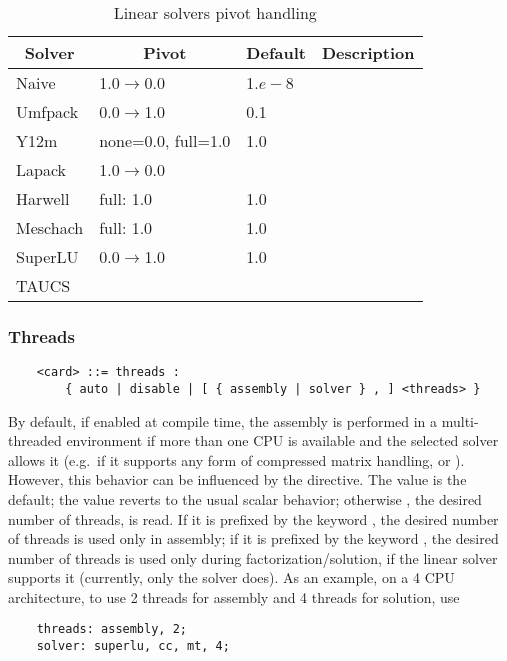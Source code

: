 \begin{table}
\centering
\caption{Linear solvers pivot handling}\label{tab:solvers-pivot}
\begin{tabular}{llll}
\hline\hline
	\multicolumn{1}{c}{\textbf{Solver}} &
	\multicolumn{1}{c}{\textbf{Pivot}} &
	\multicolumn{1}{c}{\textbf{Default}} &
	\multicolumn{1}{c}{\textbf{Description}} \\
\hline
	Naive		& 1.0$\rightarrow$0.0	& 1.$e-8$	& \\
	Umfpack 	& 0.0$\rightarrow$1.0 	& 0.1 		& \\
	Y12m 		& none=0.0, full=1.0	& 1.0		& \\
	Lapack		& 1.0$\rightarrow$0.0	&		& \\
	Harwell		& full: 1.0		& 1.0		& \\
	Meschach	& full: 1.0		& 1.0		& \\
	SuperLU		& 0.0$\rightarrow$1.0	& 1.0		& \\
	TAUCS		&			&		& \\
\hline\hline
\end{tabular}
\end{table}


\subsubsection{Threads}   
\begin{verbatim}
    <card> ::= threads :
        { auto | disable | [ { assembly | solver } , ] <threads> }
\end{verbatim}
By default, if enabled at compile time, the assembly is performed
in a multi-threaded environment if more than one CPU is available 
and the selected solver allows it (e.g.\ if it supports any form 
of compressed matrix handling,  or ).
However, this behavior can be influenced by the  directive.
The value  is the default; the value  reverts
to the usual scalar behavior; otherwise , the desired 
number of threads, is read.
If it is prefixed by the keyword , the desired number
of threads is used only in assembly; if it is prefixed by the keyword
, the desired number of threads is used only during 
factorization/solution, if the linear solver supports it (currently,
only the  solver does).
As an example, on a 4 CPU architecture, to use 2 threads for assembly
and 4 threads for solution, use
\begin{verbatim}
    threads: assembly, 2;
    solver: superlu, cc, mt, 4;
\end{verbatim}





